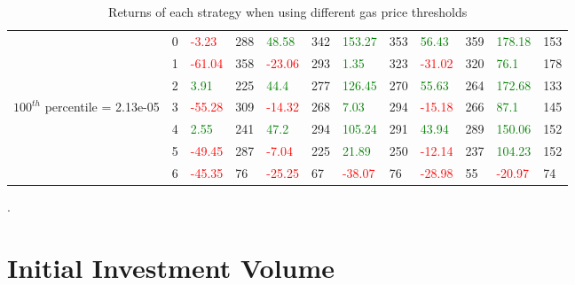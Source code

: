 \begin{table}[htb!]
\begin{adjustwidth}{-0.9in}{-0.9in}
\begin{tabular}{|p{5em}|p{2em}|p{3em}|p{3em}|p{3em}|p{3em}|p{3em}|p{3em}|p{3em}|p{3em}|p{3em}|p{3em}|}
            & 0 & \textcolor{red}{-3.23} & 288 & \textcolor{green}{48.58} & 342 & \textcolor{green}{153.27} & 353 & \textcolor{green}{56.43} & 359 & \textcolor{green}{178.18} & 153\\\cline{3-12}
            & 1 & \textcolor{red}{-61.04} & 358 & \textcolor{red}{-23.06} & 293 & \textcolor{green}{1.35} & 323 & \textcolor{red}{-31.02} & 320 & \textcolor{green}{76.1} & 178\\\cline{3-12}
            & 2 & \textcolor{green}{3.91} & 225 & \textcolor{green}{44.4} & 277 & \textcolor{green}{126.45} & 270 & \textcolor{green}{55.63} & 264 & \textcolor{green}{172.68} & 133\\\cline{3-12}
            $100^{th}$ percentile = 2.13e-05 & 3 & \textcolor{red}{-55.28} & 309 & \textcolor{red}{-14.32} & 268 & \textcolor{green}{7.03} & 294 & \textcolor{red}{-15.18} & 266 & \textcolor{green}{87.1} & 145\\[-5.5ex]\cline{3-12}
            & 4 & \textcolor{green}{2.55} & 241 & \textcolor{green}{47.2} & 294 & \textcolor{green}{105.24} & 291 & \textcolor{green}{43.94} & 289 & \textcolor{green}{150.06} & 152\\\cline{3-12}
            & 5 & \textcolor{red}{-49.45} & 287 & \textcolor{red}{-7.04} & 225 & \textcolor{green}{21.89} & 250 & \textcolor{red}{-12.14} & 237 & \textcolor{green}{104.23} & 152\\\cline{3-12}
            & 6 & \textcolor{red}{-45.35} & 76 & \textcolor{red}{-25.25} & 67 & \textcolor{red}{-38.07} & 76 & \textcolor{red}{-28.98} & 55 & \textcolor{red}{-20.97} & 74\\\hline
        \end{tabular}
    \end{adjustwidth}
    \caption{Returns of each strategy when using different gas price thresholds \label{tab:VaryGasPriceThresholds}}.
\end{table}

\section{Initial Investment Volume}

            
